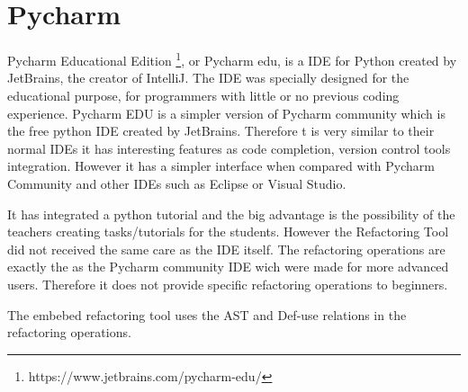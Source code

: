 \section{Pycharm}
Pycharm Educational Edition \footnote{https://www.jetbrains.com/pycharm-edu/},
 or Pycharm edu, is a IDE for Python created by JetBrains,
the creator of IntelliJ.
The IDE was specially designed for the educational purpose, for programmers
with little or no previous coding experience.
Pycharm EDU is a simpler version of Pycharm community which is the free
python IDE created by JetBrains.
Therefore t is very similar to their normal IDEs it has interesting features
as code completion, version control tools integration.
However it has a simpler interface when compared with
Pycharm Community and other IDEs such as Eclipse or Visual Studio. %

It has integrated a python tutorial and the big advantage is the possibility of
the teachers creating tasks/tutorials for the students.
However the Refactoring Tool did not received the same care as the IDE itself.
The refactoring operations are exactly the as the Pycharm community IDE wich were made
for more advanced users.
Therefore it does not provide specific refactoring operations to beginners.

The embebed refactoring tool uses the AST and Def-use relations in the refactoring
operations.

